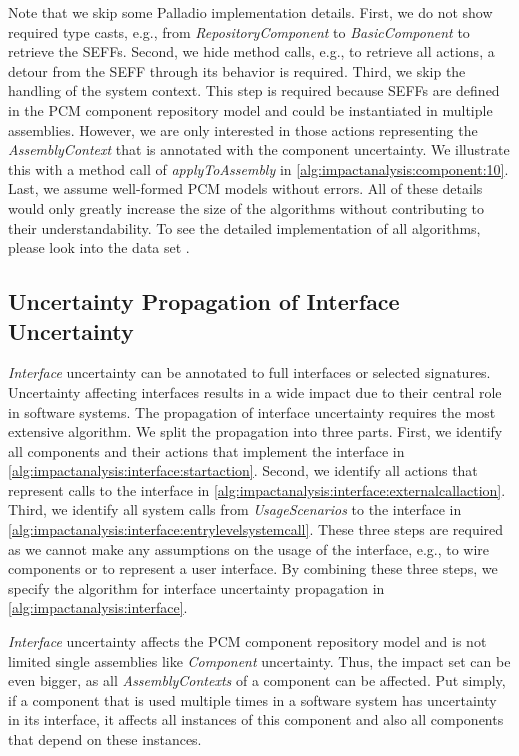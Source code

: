 Note that we skip some Palladio \cite{reussner_palladio_2024} implementation details.
First, we do not show required type casts, e.g., from \emph{RepositoryComponent} to \emph{BasicComponent} to retrieve the \acp{SEFF}.
Second, we hide method calls, e.g., to retrieve all actions, a detour from the \ac{SEFF} through its behavior is required.
Third, we skip the handling of the system context.
This step is required because \acp{SEFF} are defined in the \ac{PCM} component repository model and could be instantiated in multiple assemblies.
However, we are only interested in those actions representing the \emph{AssemblyContext} that is annotated with the component uncertainty.
We illustrate this with a method call of \emph{applyToAssembly} in \autoref{alg:impactanalysis:component:10}.
Last, we assume well-formed \ac{PCM} models without errors.
All of these details would only greatly increase the size of the algorithms without contributing to their understandability.
To see the detailed implementation of all algorithms, please look into the data set \cite{dataset}.


\subsection{Uncertainty Propagation of Interface Uncertainty}

\emph{Interface} uncertainty can be annotated to full interfaces or selected signatures.
Uncertainty affecting interfaces results in a wide impact due to their central role in software systems.
The propagation of interface uncertainty requires the most extensive algorithm.
We split the propagation into three parts.
First, we identify all components and their actions that implement the interface in \autoref{alg:impactanalysis:interface:startaction}.
Second, we identify all actions that represent calls to the interface in \autoref{alg:impactanalysis:interface:externalcallaction}.
Third, we identify all system calls from \emph{UsageScenarios} to the interface in \autoref{alg:impactanalysis:interface:entrylevelsystemcall}.
These three steps are required as we cannot make any assumptions on the usage of the interface, e.g., to wire components or to represent a user interface.
By combining these three steps, we specify the algorithm for interface uncertainty propagation in \autoref{alg:impactanalysis:interface}.

\emph{Interface} uncertainty affects the \ac{PCM} component repository model and is not limited single assemblies like \emph{Component} uncertainty.
Thus, the impact set can be even bigger, as all \emph{AssemblyContexts} of a component can be affected.
Put simply, if a component that is used multiple times in a software system has uncertainty in its interface, it affects all instances of this component and also all components that depend on these instances.

